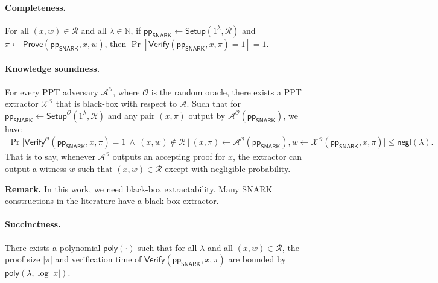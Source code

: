 \documentclass{article}
\newcommand{\ppSNARK}[0]{\mathsf{pp}_{\mathsf{SNARK}}}
\newcommand{\negl}{\mathsf{negl}}
\newcommand{\poly}{\mathsf{poly}}
\begin{document}
\paragraph{Completeness.}
For all $(x,w)\in\mathcal{R}$ and all $\lambda\in\mathbb{N}$, if $\ppSNARK\leftarrow\mathsf{Setup}(1^\lambda,\mathcal{R})$ and $\pi\leftarrow\mathsf{Prove}(\ppSNARK,x,w)$, then $\Pr[\mathsf{Verify}(\ppSNARK,x,\pi)=1]=1$.

\paragraph{Knowledge soundness.}

For every PPT adversary $\mathcal{A}^{\mathcal{O}}$, where $\mathcal{O}$ is the random oracle, there exists a PPT extractor $\mathcal{X}^{\mathcal{O}}$ that is black-box with respect to $\mathcal{A}$.  Such that for $\ppSNARK \leftarrow \mathsf{Setup}^{\mathcal{O}}(1^\lambda,\mathcal{R})$ and any pair $(x,\pi)$ output by $\mathcal{A}^{\mathcal{O}}(\ppSNARK)$, we have
\begin{align*}
    \Pr\Big[\mathsf{Verify}^{\mathcal{O}}(\ppSNARK,x,\pi)=1 \ \land\ (x,w)\notin\mathcal{R}\ | \  (x,\pi)\leftarrow \mathcal{A}^{\mathcal{O}}(\ppSNARK), w \leftarrow \mathcal{X}^\mathcal{O}(\ppSNARK,x,\pi)\Big]\le \negl(\lambda).
\end{align*}
That is to say, whenever $\mathcal{A}^{\mathcal{O}}$ outputs an accepting proof for $x$, the extractor can output a witness $w$ such that $(x,w)\in\mathcal{R}$ except with negligible probability.


\textbf{Remark.} In this work, we need black-box extractability. Many SNARK constructions in the literature have a black-box extractor.



\paragraph{Succinctness.}
There exists a polynomial $\poly(\cdot)$ such that for all $\lambda$ and all $(x,w)\in\mathcal{R}$, the proof size $|\pi|$ and verification time of $\mathsf{Verify}(\ppSNARK,x,\pi)$ are bounded by $\poly(\lambda,\log|x|)$.
\end{document}

